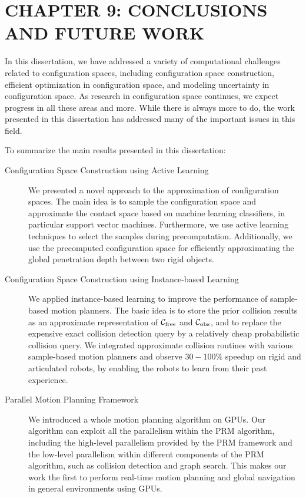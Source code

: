 \chapter[CONCLUSIONS AND FUTURE WORK]{CHAPTER 9: CONCLUSIONS AND FUTURE WORK}
\label{chp:Conclusion}
In this dissertation, we have addressed a variety of computational challenges related to configuration spaces, including configuration space construction, efficient optimization in configuration space, and modeling uncertainty in configuration space. As research in configuration space continues, we expect progress in all these areas and more. While there is always more to do, the work presented in this dissertation has addressed many of the important issues in this field.

To summarize the main results presented in this dissertation:
\begin{description}
\item[Configuration Space Construction using Active Learning] We presented a novel approach to the approximation of configuration spaces. The main idea is to sample the configuration space and approximate the contact space based on machine learning classifiers, in particular support vector machines.
Furthermore, we use active learning techniques to select the samples during precomputation. Additionally, we use the precomputed configuration space for efficiently approximating the global penetration depth between two rigid objects.
\item[Configuration Space Construction using Instance-based Learning] We applied instance-based learning to improve the performance of sample-based motion planners. The basic idea is to store the prior collision results as an approximate representation of $\mathcal C_{\text{free}}$ and $\mathcal C_{\text{obs}}$, and to replace the expensive exact collision detection query by a relatively cheap probabilistic collision query. We integrated approximate collision routines with various sample-based motion planners and observe $30-100\%$ speedup on rigid and articulated robots, by enabling the robots to learn from their past experience.
\item[Parallel Motion Planning Framework] We introduced a whole motion planning algorithm on GPUs. Our algorithm can exploit all the parallelism within the PRM algorithm, including the high-level parallelism provided by the PRM framework and the low-level parallelism within different components of the PRM algorithm, such as collision detection and graph search. This makes our work the first to perform real-time motion planning and global navigation in general environments using GPUs.

\end{description}
